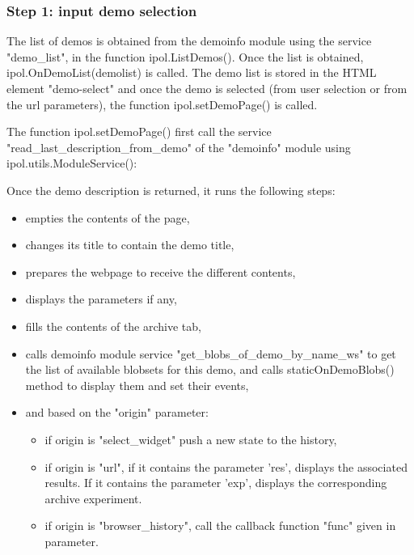 \subsubsection{Step 1: input demo selection}

The list of demos is obtained from the demoinfo module using the service "demo\_list",
in the function ipol.ListDemos(). Once the list is obtained, 
ipol.OnDemoList(demolist) is called.
The demo list is stored in the HTML element "demo-select" and once the demo is
selected (from user selection or from the url parameters), the function 
ipol.setDemoPage() is called.

The function ipol.setDemoPage() first call the service "read\_last\-\_des\-crip\-tion\_from\_demo"
of the "demoinfo" module using ipol.utils.ModuleService():
%

Once the demo description is returned, it runs the following steps:
\begin{itemize}
  \item empties the contents of the page,
  \item changes its title to contain the demo title,
  \item prepares the webpage to receive the different contents,
  \item displays the parameters if any,
  \item fills the contents of the archive tab,
  \item calls demoinfo module service "get\_blobs\-\_of\-\_demo\-\_by\-\_name\-\_ws"
to get the list of available blobsets for this demo, and calls staticOnDemoBlobs()
method to display them and set their events,
  \item and based on the "origin" parameter:
    \begin{itemize}
      \item if origin is "select\_widget" push a new state to the history,
      \item if origin is "url", if it contains the parameter 'res', displays
            the associated results. If it contains the parameter 'exp', displays
            the corresponding archive experiment.
      \item if origin is "browser\_history", call the callback function "func" 
            given in parameter.
    \end{itemize}
\end{itemize}

